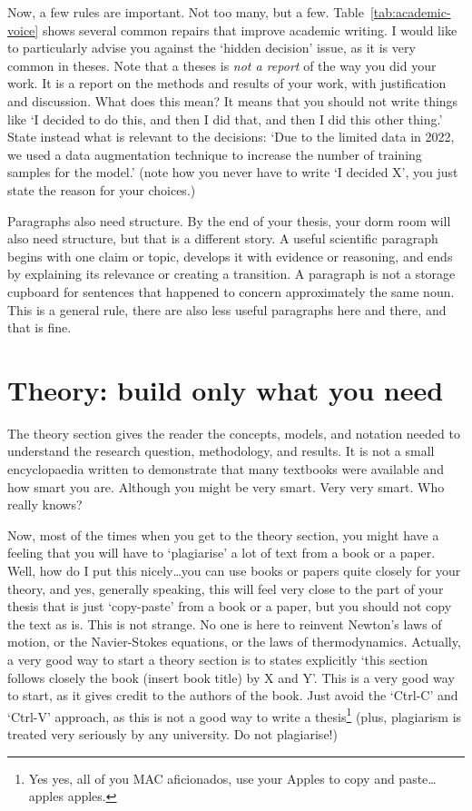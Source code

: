 \documentclass[masters,en,listoffigures,listoftables,acronyms]{NMBU}
\begin{document}
Now, a few rules are important.
Not too many, but a few.
Table~\ref{tab:academic-voice} shows several common repairs that improve academic writing.
I would like to particularly advise you against the `hidden decision' issue, as it is very common in theses.
Note that a theses is \emph{not a report} of the way you did your work.
It is a report on the methods and results of your work, with justification and discussion.
What does this mean? It means that you should not write things like `I decided to do this, and then I did that, and then I did this other thing.'
State instead what is relevant to the decisions: `Due to the limited data in 2022, we used a data augmentation technique to increase the number of training samples for the model.' (note how you never have to write `I decided X', you just state the reason for your choices.)

Paragraphs also need structure.
By the end of your thesis, your dorm room will also need structure, but that is a different story.
A useful scientific paragraph begins with one claim or topic, develops it with evidence or reasoning, and ends by explaining its relevance or creating a transition.
A paragraph is not a storage cupboard for sentences that happened to concern approximately the same noun.
This is a general rule, there are also less useful paragraphs here and there, and that is fine.

\clearpage
\section{Theory: build only what you need}\label{sec:theory}

The theory section gives the reader the concepts, models, and notation needed to understand the research question, methodology, and results.
It is not a small encyclopaedia written to demonstrate that many textbooks were available and how smart you are.
Although you might be very smart.
Very very smart.
Who really knows?

Now, most of the times when you get to the theory section, you might have a feeling that you will have to `plagiarise' a lot of text from a book or a paper.
Well, how do I put this nicely\dots you can use books or papers quite closely for your theory, and yes, generally speaking, this will feel very close to the part of your thesis that is just `copy-paste' from a book or a paper, but you should not copy the text as is.
This is not strange.
No one is here to reinvent Newton's laws of motion, or the Navier-Stokes equations, or the laws of thermodynamics.
Actually, a very good way to start a theory section is to states explicitly `this section follows closely the book (insert book title) by X and Y'.
This is a very good way to start, as it gives credit to the authors of the book.
Just avoid the `Ctrl-C' and `Ctrl-V' approach, as this is not a good way to write a thesis\footnote{Yes yes, all of you MAC aficionados, use your Apples to copy and paste\dots apples apples.} (plus, plagiarism is treated very seriously by any university. Do not plagiarise!)
\end{document}
